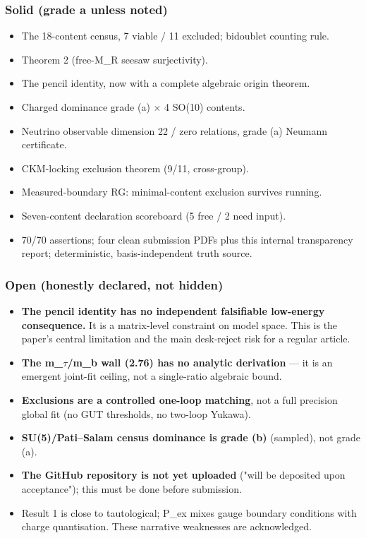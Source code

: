 \documentclass[11pt]{article}
\begin{document}
\subsubsection*{Solid (grade a unless noted)}
\begin{itemize}
\item The 18-content census, 7 viable / 11 excluded; bidoublet counting rule.
\item Theorem 2 (free-M\_R seesaw surjectivity).
\item The pencil identity, now with a complete algebraic origin theorem.
\item Charged dominance grade (a) $\times$ 4 SO(10) contents.
\item Neutrino observable dimension 22 / zero relations, grade (a) Neumann certificate.
\item CKM-locking exclusion theorem (9/11, cross-group).
\item Measured-boundary RG: minimal-content exclusion survives running.
\item Seven-content declaration scoreboard (5 free / 2 need input).
\item 70/70 assertions; four clean submission PDFs plus this internal transparency report; deterministic, basis-independent truth source.
\end{itemize}

\subsubsection*{Open (honestly declared, not hidden)}
\begin{itemize}
\item \textbf{The pencil identity has no independent falsifiable low-energy consequence.} It
  is a matrix-level constraint on model space. This is the paper's central
  limitation and the main desk-reject risk for a regular article.
\item \textbf{The m\_$\tau$/m\_b wall (2.76) has no analytic derivation} --- it is an emergent
  joint-fit ceiling, not a single-ratio algebraic bound.
\item \textbf{Exclusions are a controlled one-loop matching}, not a full precision global fit
  (no GUT thresholds, no two-loop Yukawa).
\item \textbf{SU(5)/Pati--Salam census dominance is grade (b)} (sampled), not grade (a).
\item \textbf{The GitHub repository is not yet uploaded} ("will be deposited upon
  acceptance"); this must be done before submission.
\item Result 1 is close to tautological; P\_ex mixes gauge boundary conditions with
  charge quantisation. These narrative weaknesses are acknowledged.
\end{itemize}
\end{document}
